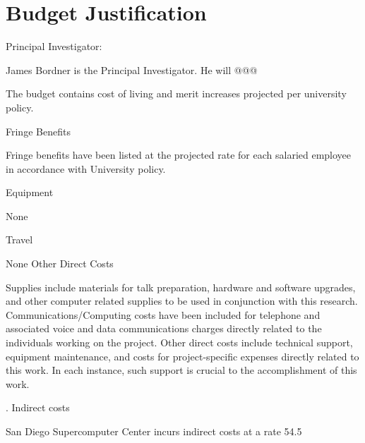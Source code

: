  

 

\section{Budget Justification}

Principal Investigator:

James Bordner is the Principal Investigator.  He will @@@

The budget contains cost of living and merit increases projected per
university policy.
 

Fringe Benefits

Fringe benefits have been listed at the projected rate for each
salaried employee in accordance with University policy.

Equipment

None

Travel

None
Other Direct Costs

Supplies include materials for talk preparation, hardware and software
upgrades, and other computer related supplies to be used in
conjunction with this research.  Communications/Computing costs have
been included for telephone and associated voice and data
communications charges directly related to the individuals working on
the project.  Other direct costs include technical support, equipment
maintenance, and costs for project-specific expenses directly related
to this work.  In each instance, such support is crucial to the
accomplishment of this work.

. 
Indirect costs

San Diego Supercomputer Center incurs indirect costs at a  rate 54.5%

 